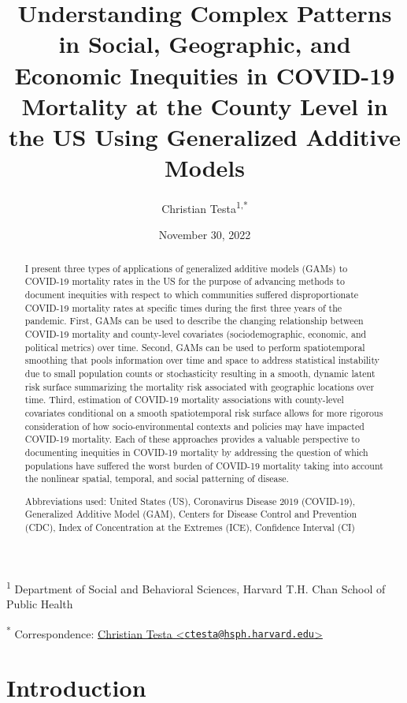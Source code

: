 \documentclass[
]{article}
\title{Understanding Complex Patterns in Social, Geographic, and Economic Inequities in COVID-19 Mortality at the County Level in the US Using Generalized Additive Models}
\author{Christian Testa\textsuperscript{1,*}}
\date{November 30, 2022}
\begin{document}
\maketitle
\begin{abstract}
I present three types of applications of generalized additive models (GAMs) to
COVID-19 mortality rates in the US for the purpose of advancing methods to
document inequities with respect to which communities suffered disproportionate
COVID-19 mortality rates at specific times during the first three years of the
pandemic. First, GAMs can be used to describe the changing
relationship between COVID-19 mortality and county-level covariates
(sociodemographic, economic, and political metrics) over time. Second, GAMs can
be used to perform spatiotemporal smoothing that pools information over time and
space to address statistical instability due to small
population counts or stochasticity resulting in a smooth, dynamic latent
risk surface summarizing the mortality risk associated with geographic locations over
time. Third, estimation of COVID-19 mortality associations with county-level covariates
conditional on a smooth spatiotemporal risk surface allows for more rigorous consideration
of how socio-environmental contexts and policies may have impacted COVID-19 mortality.
Each of these approaches
provides a valuable perspective to documenting inequities in
COVID-19 mortality by addressing the question of which populations have suffered
the worst burden of COVID-19 mortality taking into account the nonlinear
spatial, temporal, and social patterning of disease.
\newline 

\noindent Abbreviations used: United States (US), Coronavirus Disease 2019 (COVID-19), Generalized
Additive Model (GAM), Centers for Disease Control and Prevention (CDC), Index of Concentration at the Extremes (ICE), Confidence Interval (CI)
\end{abstract}

\textsuperscript{1} Department of Social and Behavioral Sciences, Harvard T.H. Chan School of Public Health

\textsuperscript{*} Correspondence: \href{mailto:ctesta@hsph.harvard.edu}{Christian Testa \textless{}\href{mailto:ctesta@hsph.harvard.edu}{\nolinkurl{ctesta@hsph.harvard.edu}}\textgreater{}}

\hypertarget{introduction}{%
\section{Introduction}\label{introduction}}
\end{document}
